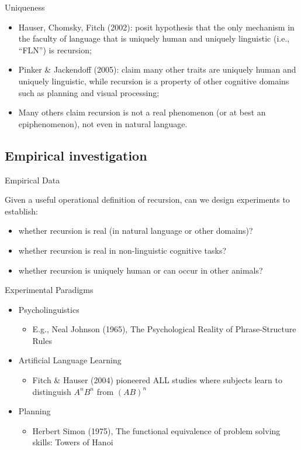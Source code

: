 \documentclass[xcolor=table]{beamer}
\begin{document}
\begin{frame}{Uniqueness}

  \begin{itemize}[<+->]
  \item Hauser, Chomsky, Fitch (2002): posit hypothesis that the only
    mechanism in the faculty of language that is uniquely human and
    uniquely linguistic (i.e., ``FLN'') is recursion;
  \item Pinker \& Jackendoff (2005): claim many other traits are
    uniquely human and uniquely linguistic, while recursion is a
    property of other cognitive domains such as planning and visual
    processing;
  \item Many others claim recursion is not a real phenomenon (or at
    best an epiphenomenon), not even in natural language.
  \end{itemize}
\end{frame}

\subsection{Empirical investigation}

\begin{frame}{Empirical Data}

Given a useful operational definition of recursion, can we design experiments to establish:
\begin{itemize}[<+->]
\item whether recursion is real (in natural language or other domains)?
\item whether recursion is real in non-linguistic cognitive tasks?
\item whether recursion is uniquely human or can occur in other animals?
\end{itemize}
\end{frame}

\begin{frame}{Experimental Paradigms}
  \begin{itemize}[<+->]
  \item Psycholinguistics
    \begin{itemize}
    \item E.g., Neal Johnson (1965), The Psychological Reality of
      Phrase-Structure Rules
    \end{itemize}
  \item Artificial Language Learning
    \begin{itemize}
    \item Fitch \& Hauser (2004) pioneered ALL studies where subjects
       learn to distinguish $A^nB^n$ from $(AB)^n$
    \end{itemize}
  \item Planning
    \begin{itemize}
    \item Herbert Simon (1975), The functional equivalence of problem
      solving skills: Towers of Hanoi
    \end{itemize}
  \end{itemize}
\end{frame}
\end{document}

